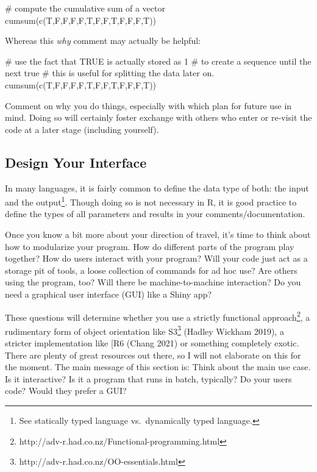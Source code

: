 \documentclass[
  12pt,
  letterpaper,
]{krantz}
\newenvironment{Shaded}{\begin{snugshade}}{\end{snugshade}}
\newcommand{\CommentTok}[1]{\textcolor[rgb]{0.37,0.37,0.37}{#1}}
\newcommand{\FunctionTok}[1]{\textcolor[rgb]{0.28,0.35,0.67}{#1}}
\newcommand{\NormalTok}[1]{\textcolor[rgb]{0.00,0.23,0.31}{#1}}
\begin{document}
\begin{Shaded}
\begin{Highlighting}[]
\CommentTok{\# compute the cumulative sum of a vector}
\FunctionTok{cumsum}\NormalTok{(}\FunctionTok{c}\NormalTok{(T,F,F,F,F,T,F,F,T,F,F,F,T))}
\end{Highlighting}
\end{Shaded}

Whereas this \emph{why} comment may actually be helpful:

\begin{Shaded}
\begin{Highlighting}[]
\CommentTok{\# use the fact that TRUE is actually stored as 1 }
\CommentTok{\# to create a sequence until the next true}
\CommentTok{\# this is useful for splitting the data later on.}
\FunctionTok{cumsum}\NormalTok{(}\FunctionTok{c}\NormalTok{(T,F,F,F,F,T,F,F,T,F,F,F,T))}
\end{Highlighting}
\end{Shaded}

Comment on why you do things, especially with which plan for future use
in mind. Doing so will certainly foster exchange with others who enter
or re-visit the code at a later stage (including yourself).

\hypertarget{design-your-interface}{%
\subsection{Design Your Interface}\label{design-your-interface}}

In many languages, it is fairly common to define the data type of both:
the input and the output\footnote{See statically typed language
  vs.~dynamically typed language.}. Though doing so is not necessary in
R, it is good practice to define the types of all parameters and results
in your comments/documentation.

Once you know a bit more about your direction of travel, it's time to
think about how to modularize your program. How do different parts of
the program play together? How do users interact with your program? Will
your code just act as a storage pit of tools, a loose collection of
commands for ad hoc use? Are others using the program, too? Will there
be machine-to-machine interaction? Do you need a graphical user
interface (GUI) like a Shiny app?

These questions will determine whether you use a strictly functional
approach\footnote{http://adv-r.had.co.nz/Functional-programming.html}, a
rudimentary form of object orientation like S3\footnote{http://adv-r.had.co.nz/OO-essentials.html}
(Hadley Wickham 2019), a stricter implementation like {[}R6 (Chang 2021)
or something completely exotic. There are plenty of great resources out
there, so I will not elaborate on this for the moment. The main message
of this section is: Think about the main use case. Is it interactive? Is
it a program that runs in batch, typically? Do your users code? Would
they prefer a GUI?
\end{document}
